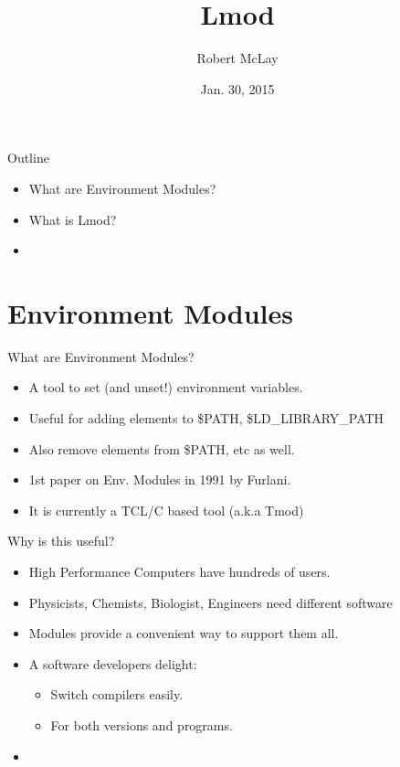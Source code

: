 \documentclass{beamer}
\title{Lmod}
\author{Robert McLay}
\institute{The Texas Advanced Computing Center}
\date{Jan. 30, 2015}  %
\begin{document}
\begin{frame}
  \titlepage
\end{frame}

\begin{frame}{Outline}
  \begin{itemize}
    \item What are Environment Modules?
    \item What is Lmod?
    \item 
  \end{itemize}
\end{frame}



\section{Environment Modules}

\begin{frame}{What are Environment Modules?}
  \begin{itemize}
    \item A tool to set (and unset!) environment variables.
    \item Useful for adding elements to \$PATH, \$LD\_LIBRARY\_PATH
    \item Also remove elements from \$PATH, etc as well.
    \item 1st paper on Env. Modules in 1991 by Furlani.
    \item It is currently a TCL/C based tool (a.k.a Tmod)
  \end{itemize}
\end{frame}

\begin{frame}{Why is this useful?}
  \begin{itemize}
    \item High Performance Computers have hundreds of users.
    \item Physicists, Chemists, Biologist, Engineers need different
      software
    \item Modules provide a convenient way to support them all.
    \item A software developers delight: 
      \begin{itemize}
        \item Switch compilers easily.
        \item For both versions and programs.
      \end{itemize}
    \item 
  \end{itemize}
\end{frame}
\end{document}
